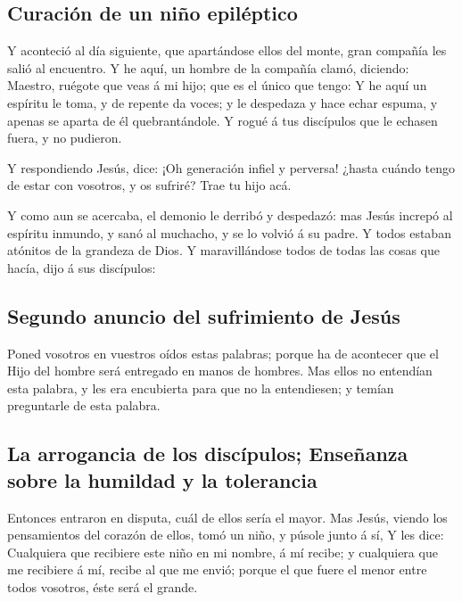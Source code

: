 \hypertarget{curaciuxf3n-de-un-niuxf1o-epiluxe9ptico}{%
\subsection{Curación de un niño
epiléptico}\label{curaciuxf3n-de-un-niuxf1o-epiluxe9ptico}}

 Y aconteció al día siguiente, que apartándose ellos del
monte, gran compañía les salió al encuentro.  Y he aquí,
un hombre de la compañía clamó, diciendo: Maestro, ruégote que veas á mi
hijo; que es el único que tengo:  Y he aquí un espíritu
le toma, y de repente da voces; y le despedaza y hace echar espuma, y
apenas se aparta de él quebrantándole.  Y rogué á tus
discípulos que le echasen fuera, y no pudieron.

 Y respondiendo Jesús, dice: ¡Oh generación infiel y
perversa! ¿hasta cuándo tengo de estar con vosotros, y os sufriré? Trae
tu hijo acá.

 Y como aun se acercaba, el demonio le derribó y
despedazó: mas Jesús increpó al espíritu inmundo, y sanó al muchacho, y
se lo volvió á su padre.  Y todos estaban atónitos de la
grandeza de Dios. Y maravillándose todos de todas las cosas que hacía,
dijo á sus discípulos:

\hypertarget{segundo-anuncio-del-sufrimiento-de-jesuxfas}{%
\subsection{Segundo anuncio del sufrimiento de
Jesús}\label{segundo-anuncio-del-sufrimiento-de-jesuxfas}}

 Poned vosotros en vuestros oídos estas palabras; porque
ha de acontecer que el Hijo del hombre será entregado en manos de
hombres.  Mas ellos no entendían esta palabra, y les era
encubierta para que no la entendiesen; y temían preguntarle de esta
palabra.

\hypertarget{la-arrogancia-de-los-discuxedpulos-enseuxf1anza-sobre-la-humildad-y-la-tolerancia}{%
\subsection{La arrogancia de los discípulos; Enseñanza sobre la humildad
y la
tolerancia}\label{la-arrogancia-de-los-discuxedpulos-enseuxf1anza-sobre-la-humildad-y-la-tolerancia}}

 Entonces entraron en disputa, cuál de ellos sería el
mayor.  Mas Jesús, viendo los pensamientos del corazón de
ellos, tomó un niño, y púsole junto á sí,  Y les dice:
Cualquiera que recibiere este niño en mi nombre, á mí recibe; y
cualquiera que me recibiere á mí, recibe al que me envió; porque el que
fuere el menor entre todos vosotros, éste será el grande.

